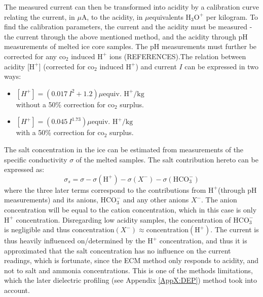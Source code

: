 \documentclass[../../CompleteThesis2/Complete_2ndDraft]{subfiles}
\begin{document}
The measured current can then be transformed into acidity by a calibration curve relating the current, in $\mu$A, to the acidity, in $\mu$equivalents $\text{H}_3\text{O}^+$ per kilogram. To find the calibration parameters, the current and the acidity must be measured - the current through the above mentioned method, and the acidity through pH measurements of melted ice core samples. The pH measurements must further be corrected for any $\text{co}_2$ induced $\text{H}^+$ ions (REFERENCES).The relation between acidity [$\text{H}^+$] (corrected for $\text{co}_2$ induced $\text{H}^+$) and current $I$ can be expressed in two ways:
\begin{itemize}
	\item $[H^+] = (0.017\, I^2 + 1.2) \mu \text{equiv. H}^+ /\text{kg}$\\
	without a 50\% correction for $\text{co}_2$ surplus.
	\item $[H^+] = (0.045\, I^{1.73}) \mu \text{equiv. H}^+ /\text{kg}$\\
	with a 50\% correction for $\text{co}_2$ surplus.
\end{itemize}
The salt concentration in the ice can be estimated from measurements of the specific conductivity $\sigma$ of the melted samples. The salt contribution hereto can be expressed as:
\begin{equation}
	\sigma_s = \sigma - \sigma(\text{H}^+) - \sigma(X^-) - \sigma(\text{HCO}_3^-)
\end{equation}
where the three later terms correspond to the contributions from $\text{H}^+$(through pH measurements) and its anions\footnotemark, $\text{HCO}_3^-$ and any other anions $X^-$. The anion concentration will be equal to the cation concentration, which in this case is only $\text{H}^+$ concentration. Disregarding low acidity samples, the concentration of $\text{HCO}_3^-$ is negligible and thus  $\text{concentration}(X^-) \approx \text{concentration}(\text{H}^+)$. 
The current is thus heavily influenced on/determined by the $\text{H}^+$ concentration, and thus it is approximated that the salt concentration has no influence on the current readings, which is fortunate, since the ECM method only responds to acidity, and not to salt and ammonia concentrations. This is one of the methods limitations, which the later dielectric profiling (see Appendix \ref{AppX:DEP}) method took into account.

\end{document}
